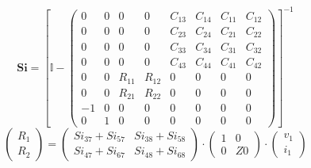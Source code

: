 \documentclass[10pt]{article} \usepackage{amsmath} \usepackage{bbold}
\begin{document}
\[ \mathbf{Si} = \left[ \mathbb{I}  - \left(\begin{array}{cccccccc} 0
& 0 & 0 & 0 & C_{13} & C_{14} & C_{11} & C_{12} \\ 0 & 0 & 0 & 0 &
C_{23} & C_{24} & C_{21} & C_{22} \\ 0 & 0 & 0 & 0 & C_{33} & C_{34} &
C_{31} & C_{32} \\ 0 & 0 & 0 & 0 & C_{43} & C_{44} & C_{41} & C_{42}
\\ 0 & 0 & R_{11} & R_{12} & 0 & 0 & 0 & 0 \\ 0 & 0 & R_{21} & R_{22}
& 0 & 0 & 0 & 0 \\ -1 & 0 & 0 & 0 & 0 & 0 & 0 & 0 \\ 0 & 1 & 0 & 0 & 0
& 0 & 0 & 0 \end{array}\right) \right]^{-1} \]
\[ \left(\begin{array}{c} R_{1} \\ R_{2}
\end{array}\right)=\left(\begin{array}{cc} Si_{37} + Si_{57} & Si_{38}
+ Si_{58} \\ Si_{47} + Si_{67} & Si_{48} + Si_{68} \end{array}\right)
\cdot \left(\begin{array}{cc} 1 & 0 \\ 0 & Z0 \end{array}\right)\cdot
\left(\begin{array}{c} v_{1} \\ i_{1} \end{array}\right) \]
\end{document}
